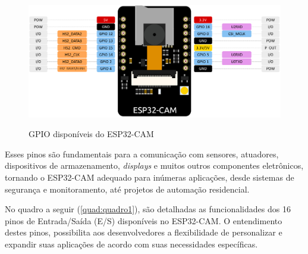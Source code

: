 \begin{figure}[h!]
    \centering
    \caption{GPIO disponíveis do ESP32-CAM}
    \includegraphics[scale=0.28]{figuras/esp32pin.jpg}
    \label{fig:esp32pin}
    \centering
\end{figure}

Esses pinos são fundamentais para a comunicação com sensores, atuadores,
dispositivos de armazenamento, \textit{displays} e muitos outros componentes
eletrônicos, tornando o ESP32-CAM
adequado para inúmeras aplicações, desde sistemas de
segurança e monitoramento, até projetos de automação residencial.

No quadro a seguir (\autoref{quad:quadro1}), são detalhadas as funcionalidades dos 16 pinos 
de Entrada/Saída (E/S) disponíveis no ESP32-CAM. O entendimento destes pinos, possibilita 
aos desenvolvedores a flexibilidade de personalizar e expandir suas 
aplicações de acordo com suas necessidades específicas.

